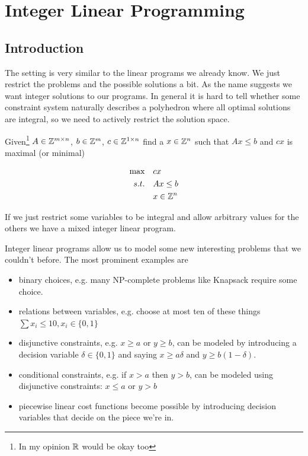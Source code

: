 \chapter{Integer Linear Programming}
\section{Introduction}

The setting is very similar to the linear programs we already know. We just restrict the problems and the possible solutions a bit. As the name suggests we want integer solutions to our programs. In general it is hard to tell whether some constraint system naturally describes a polyhedron where all optimal solutions are integral, so we need to actively restrict the solution space. 

\begin{Def} Given\footnote{In my opinion $\mathbb{R}$ would be okay too} $A\in \mathbb{Z}^{m\times n}$, $b\in \mathbb{Z}^m$, $c\in \mathbb{Z}^{1\times n}$ find a $x\in \mathbb{Z}^n$ such that $Ax\leq b$ and $cx$ is maximal (or minimal)

\begin{align*}
\max \quad & cx \\
s.t. \quad & Ax \leq b\\
&x\in \mathbb{Z}^n
\end{align*}
\end{Def}

If we just restrict some variables to be integral and allow arbitrary values for the others we have a mixed integer linear program.

Integer linear programs allow us to model some new interesting problems that we couldn't before. The most prominent examples are 

\begin{itemize}
\item binary choices, e.g. many NP-complete problems like Knapsack require some choice. 
\item relations between variables, e.g. choose at most ten of these things $\sum x_i \leq 10, x_i\in \{0,1\}$
\item disjunctive constraints, e.g. $x\geq a$ or $y\geq b$, can be modeled by introducing a decision variable $\delta \in \{0,1\}$ and saying $x\geq a\delta$ and $y \geq b(1-\delta)$. 
\item conditional constraints, e.g. if $x>a$ then $y>b$, can be modeled using disjunctive constraints: $x\leq a$ or $y>b$
\item piecewise linear cost functions become possible by introducing decision variables that decide on the piece we're in.
\end{itemize}

